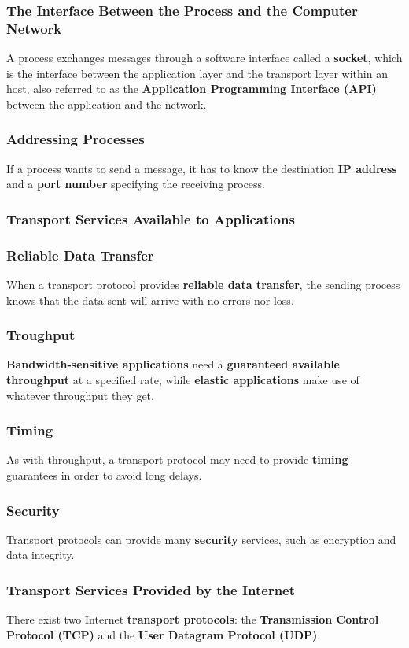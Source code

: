 \documentclass{article}
\begin{document}
\subsubsection*{The Interface Between the Process and the Computer Network}
A process exchanges messages through a software interface called a \textbf{socket}, which is the interface between the application layer and the transport layer within an host, also referred to as the \textbf{Application Programming Interface (API)} between the application and the network.
\subsubsection*{Addressing Processes}
If a process wants to send a message, it has to know the destination \textbf{IP address} and a \textbf{port number} specifying the receiving process.
\newpage
\subsubsection{Transport Services Available to Applications}
\subsubsection*{Reliable Data Transfer}
When a transport protocol provides \textbf{reliable data transfer}, the sending process knows that the data sent will arrive with no errors nor loss.
\subsubsection*{Troughput}
\textbf{Bandwidth-sensitive applications} need a \textbf{guaranteed available throughput} at a specified rate, while \textbf{elastic applications} make use of whatever throughput they get.
\subsubsection*{Timing}
As with throughput, a transport protocol may need to provide \textbf{timing} guarantees in order to avoid long delays.
\subsubsection*{Security}
Transport protocols can provide many \textbf{security} services, such as encryption and data integrity.
\subsubsection{Transport Services Provided by the Internet}
There exist two Internet \textbf{transport protocols}: the \textbf{Transmission Control Protocol (TCP)} and the \textbf{User Datagram Protocol (UDP)}.
\end{document}
